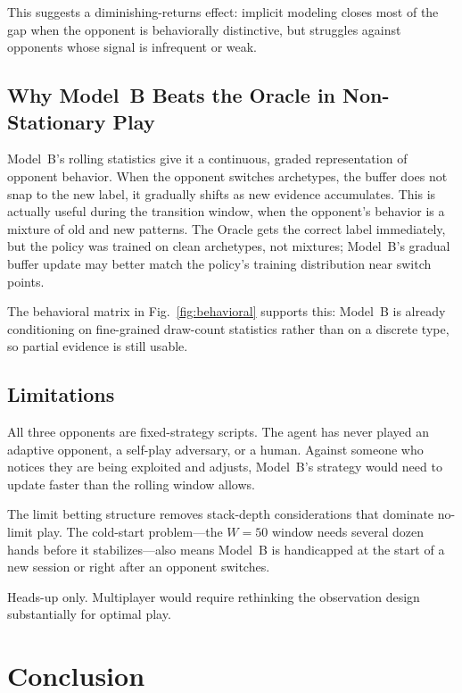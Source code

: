 \documentclass[11pt, conference]{IEEEtran}
\begin{document}
This suggests a diminishing-returns effect: implicit modeling closes most
of the gap when the opponent is behaviorally distinctive, but struggles
against opponents whose signal is infrequent or weak.

\subsection{Why Model~B Beats the Oracle in Non-Stationary Play}

Model~B's rolling statistics give it a continuous, graded representation
of opponent behavior. When the opponent switches archetypes, the buffer
does not snap to the new label, it gradually shifts as new evidence
accumulates. This is actually useful during the transition window, when
the opponent's behavior is a mixture of old and new patterns. The Oracle
gets the correct label immediately, but the policy was trained on clean
archetypes, not mixtures; Model~B's gradual buffer update may better
match the policy's training distribution near switch points.

The behavioral matrix in Fig.~\ref{fig:behavioral} supports this: Model~B
is already conditioning on fine-grained draw-count statistics rather than
on a discrete type, so partial evidence is still usable.

\subsection{Limitations}

All three opponents are fixed-strategy scripts. The agent has never played
an adaptive opponent, a self-play adversary, or a human. Against someone
who notices they are being exploited and adjusts, Model~B's strategy would
need to update faster than the rolling window allows.

The limit betting structure removes stack-depth considerations that dominate
no-limit play. The cold-start problem---the $W=50$ window needs several
dozen hands before it stabilizes---also means Model~B is handicapped at
the start of a new session or right after an opponent switches.

Heads-up only. Multiplayer would require rethinking the observation design
substantially for optimal play.

\section{Conclusion}
\label{sec:conclusion}
\end{document}

